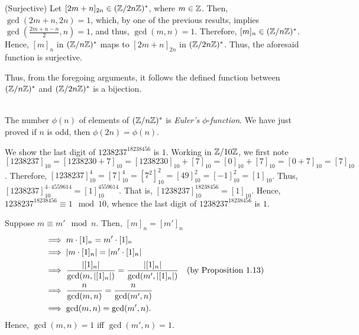 \begin{xca}
\begin{itemize}
(Surjective) Let $[2m + n]_{2n} \in (\mathbb{Z}/{2n\mathbb{Z}})^*$, where $m \in \mathbb{Z}$. Then,
$\gcd(2m + n, 2n) = 1$, which, by one of the previous results, implies
$\gcd(\frac{2m + n - n}{2}, n) = 1$, and thus, $\gcd(m, n) = 1$. Therefore,
$[m]_n \in (\mathbb{Z}/{n\mathbb{Z}})^*$. Hence, $[m]_n$ in $(\mathbb{Z}/{n\mathbb{Z}})^*$ maps to
$[2m + n]_{2n}$ in $(\mathbb{Z}/{2n\mathbb{Z}})^*$. Thus, the aforesaid function is surjective.

Thus, from the foregoing arguments, it follows the defined function between
$(\mathbb{Z}/{n\mathbb{Z}})^*$ and $(\mathbb{Z}/{2n\mathbb{Z}})^*$ is a bijection.

~\\
The number $\phi(n)$ of elements of $(\mathbb{Z}/{n\mathbb{Z}})^*$ is \emph{Euler's}
$\phi$-\emph{function}. We have just proved if $n$ is odd, then $\phi(2n) =
\phi(n)$.
\end{itemize}
\end{xca}

\begin{xca}
We show the last digit of $1238237^{18238456}$ is $1$. Working in $\mathbb{Z}/{10\mathbb{Z}}$,
we first note $[1238237]_{10} = [1238230 + 7]_{10} = [1238230]_{10} + [7]_{10}
= [0]_{10} + [7]_{10} = [0 + 7]_{10} = [7]_{10}$. Therefore, $[1238237]_{10}^4
= [7]_{10}^4 = [7^2]_{10}^2 = [49]_{10}^2 = [-1]_{10}^2 = [1]_{10}$. Thus,
$[1238237]_{10}^{4 \cdot 4559614} = [1]_{10}^{4559614}$. That is,
$[1238237]_{10}^{18238456} = [1]_{10}$. Hence, $1238237^{18238456} \equiv 1
\mod 10$, whence the last digit of $1238237^{18238456}$ is $1$.
\end{xca}

\begin{xca}
Suppose $m \equiv m' \mod n$. Then, $[m]_n = [m']_n$
\begin{align*}
&\implies m \cdot [1]_n = m' \cdot [1]_n \\
&\implies |m \cdot [1]_n| = |m' \cdot [1]_n| \\
&\implies \frac{|[1]_n|}{\gcd(m, |[1]_n|)} = \frac{|[1]_n|}{\gcd(m', |[1]_n|)}
\quad (\text{by Proposition 1.13}) \\
&\implies \frac{n}{\gcd(m, n)} = \frac{n}{\gcd(m', n)} \\
&\implies \gcd(m, n) = \gcd(m', n).
\end{align*}
Hence, $\gcd(m, n) = 1$ iff $\gcd(m', n) = 1$.
\end{xca}

\begin{xca}
\end{xca}

